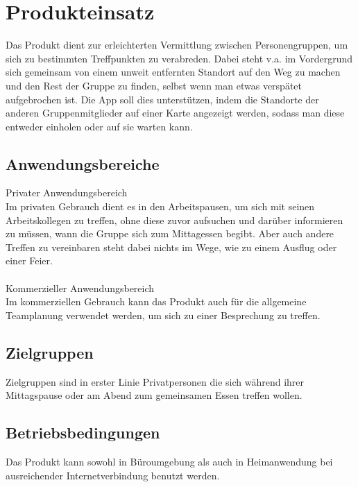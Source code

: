 \section{Produkteinsatz}
Das Produkt dient zur erleichterten Vermittlung zwischen Personengruppen, um sich zu bestimmten Treffpunkten zu verabreden. Dabei steht v.a. im Vordergrund sich gemeinsam von einem unweit entfernten Standort auf den Weg zu machen und den Rest der Gruppe zu finden, selbst wenn man etwas verspätet aufgebrochen ist. 
Die App soll dies unterstützen, indem die Standorte der anderen Gruppenmitglieder auf einer Karte angezeigt werden, sodass man diese entweder einholen oder auf sie warten kann.\\
\subsection{Anwendungsbereiche}
Privater Anwendungsbereich\\
Im privaten Gebrauch dient es in den Arbeitspausen, um sich mit seinen Arbeitskollegen zu treffen, ohne diese zuvor aufsuchen und darüber informieren zu müssen, wann die Gruppe sich zum Mittagessen begibt. Aber auch andere Treffen zu vereinbaren steht dabei nichts im Wege, wie zu einem Ausflug oder einer Feier.\\ \\
Kommerzieller Anwendungsbereich\\
Im kommerziellen Gebrauch kann das Produkt auch für die allgemeine Teamplanung verwendet werden, um sich zu einer Besprechung zu treffen. \\
\subsection{Zielgruppen}
Zielgruppen sind in erster Linie Privatpersonen die sich während ihrer Mittagspause oder am Abend zum gemeinsamen Essen treffen wollen. \\
\subsection{Betriebsbedingungen}
Das Produkt kann sowohl in Büroumgebung als auch in Heimanwendung bei ausreichender Internetverbindung benutzt werden. \\

